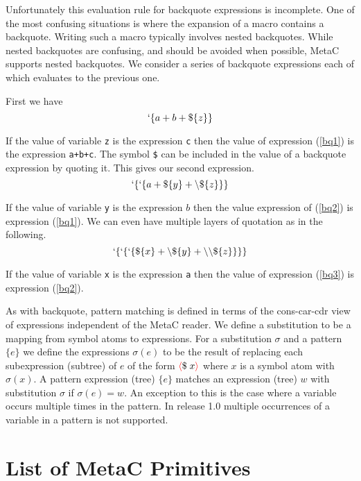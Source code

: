 \documentclass{article}
\newcommand{\fopen}{{\color{red} \langle}}
\newcommand{\fclose}{{\color{red} \rangle}}
\begin{document}
Unfortunately this evaluation rule for backquote expressions is incomplete.  One of the most
confusing situations is where the expansion of a macro contains a backquote.  Writing such a macro typically involves nested backquotes.  While nested backquotes
are confusing, and should be avoided when possible, MetaC supports nested backquotes.  We consider a series of backquote expressions each of which evaluates to the previous one.

First we have
\begin{equation}
\label{bq1}
`\{a+b+\$\{z\}\}
\end{equation}

If the value of variable {\tt z} is the expression {\tt c} then the value of expression (\ref{bq1}) is the expression {\tt a+b+c}.
The symbol {\tt \$} can be included in the value of a backquote expression by quoting it.  This gives our second expression.
\begin{equation}
\label{bq2}
`\{`\{a + \$\{y\} + \backslash\$\{z\}\}\}
\end{equation}

If the value of variable {\tt y} is the expression $b$ then the value expression of (\ref{bq2}) is expression (\ref{bq1}).
We can even have multiple layers of quotation as in the following.
\begin{equation}
\label{bq3}
`\{`\{`\{\$\{x\} + \backslash\$\{y\} + \backslash\backslash\$\{z\}\}\}\}
\end{equation}

If the value of variable {\tt x} is the expression {\tt a} then the value of expression (\ref{bq3}) is expression (\ref{bq2}).

As with backquote, pattern matching is defined in terms of the cons-car-cdr view of expressions independent of the MetaC reader.  We define a substitution to be a mapping from
symbol atoms to expressions. For a substitution $\sigma$ and a pattern $\{e\}$ we define the expressions $\sigma(e)$
to be the result of replacing each subexpression (subtree) of $e$ of the form $\fopen \$\;x \fclose$ where $x$ is a symbol atom with $\sigma(x)$.  A pattern expression (tree) $\{e\}$ matches an expression (tree) $w$ with substitution $\sigma$
if $\sigma(e) = w$. An exception to this is the case where a variable occurs multiple times in the pattern.  In release 1.0 multiple occurrences of a variable in a pattern is not supported.

\section{List of MetaC Primitives}
\end{document}
